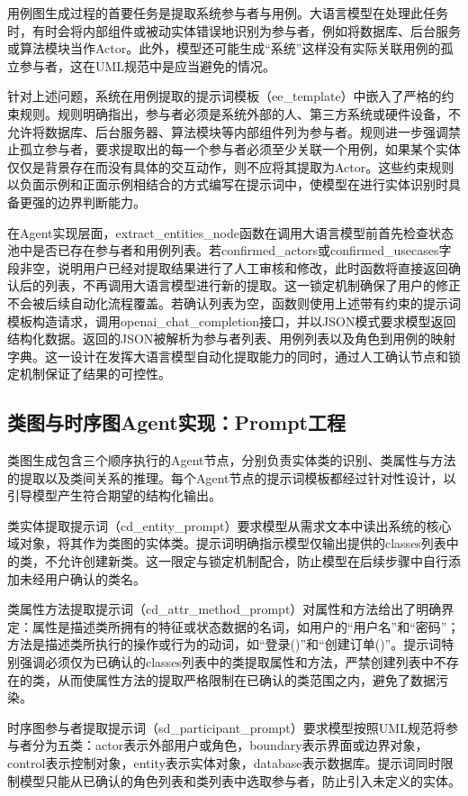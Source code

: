 用例图生成过程的首要任务是提取系统参与者与用例。大语言模型在处理此任务时，有时会将内部组件或被动实体错误地识别为参与者，例如将数据库、后台服务或算法模块当作Actor。此外，模型还可能生成“系统”这样没有实际关联用例的孤立参与者，这在UML规范中是应当避免的情况。

针对上述问题，系统在用例提取的提示词模板（ee\_template）中嵌入了严格的约束规则。规则明确指出，参与者必须是系统外部的人、第三方系统或硬件设备，不允许将数据库、后台服务器、算法模块等内部组件列为参与者。规则进一步强调禁止孤立参与者，要求提取出的每一个参与者必须至少关联一个用例，如果某个实体仅仅是背景存在而没有具体的交互动作，则不应将其提取为Actor。这些约束规则以负面示例和正面示例相结合的方式编写在提示词中，使模型在进行实体识别时具备更强的边界判断能力。

在Agent实现层面，extract\_entities\_node函数在调用大语言模型前首先检查状态池中是否已存在参与者和用例列表。若confirmed\_actors或confirmed\_usecases字段非空，说明用户已经对提取结果进行了人工审核和修改，此时函数将直接返回确认后的列表，不再调用大语言模型进行新的提取。这一锁定机制确保了用户的修正不会被后续自动化流程覆盖。若确认列表为空，函数则使用上述带有约束的提示词模板构造请求，调用openai\_chat\_completion接口，并以JSON模式要求模型返回结构化数据。返回的JSON被解析为参与者列表、用例列表以及角色到用例的映射字典。这一设计在发挥大语言模型自动化提取能力的同时，通过人工确认节点和锁定机制保证了结果的可控性。

\subsection{类图与时序图Agent实现：Prompt工程}

类图生成包含三个顺序执行的Agent节点，分别负责实体类的识别、类属性与方法的提取以及类间关系的推理。每个Agent节点的提示词模板都经过针对性设计，以引导模型产生符合期望的结构化输出。

类实体提取提示词（cd\_entity\_prompt）要求模型从需求文本中读出系统的核心域对象，将其作为类图的实体类。提示词明确指示模型仅输出提供的classes列表中的类，不允许创建新类。这一限定与锁定机制配合，防止模型在后续步骤中自行添加未经用户确认的类名。

类属性方法提取提示词（cd\_attr\_method\_prompt）对属性和方法给出了明确界定：属性是描述类所拥有的特征或状态数据的名词，如用户的“用户名”和“密码”；方法是描述类所执行的操作或行为的动词，如“登录()”和“创建订单()”。提示词特别强调必须仅为已确认的classes列表中的类提取属性和方法，严禁创建列表中不存在的类，从而使属性方法的提取严格限制在已确认的类范围之内，避免了数据污染。

时序图参与者提取提示词（sd\_participant\_prompt）要求模型按照UML规范将参与者分为五类：actor表示外部用户或角色，boundary表示界面或边界对象，control表示控制对象，entity表示实体对象，database表示数据库。提示词同时限制模型只能从已确认的角色列表和类列表中选取参与者，防止引入未定义的实体。

